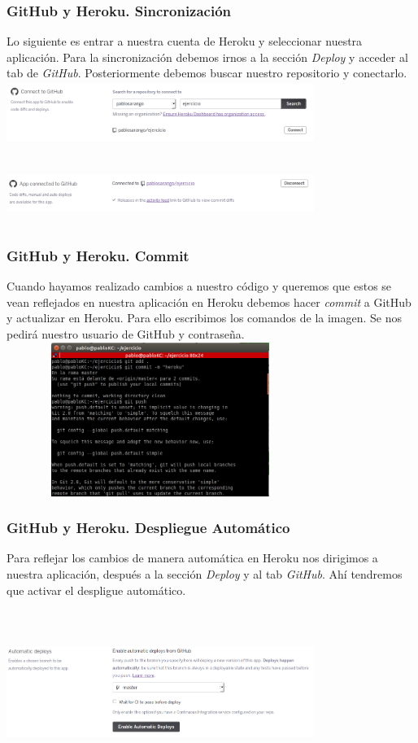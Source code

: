 \documentclass{beamer}
\begin{document}
\begin{frame}
\frametitle{GitHub y Heroku. Sincronización}
Lo siguiente es entrar a nuestra cuenta de Heroku y seleccionar nuestra aplicación. Para la sincronización debemos irnos a la sección \textit{Deploy} y acceder al tab de \textit{GitHub}. Posteriormente debemos buscar nuestro repositorio y conectarlo.\\
\centering
\includegraphics[width=10cm, height=2cm]{githubHeroku/15.png}
\\ \ \\
\includegraphics[width=10cm, height=2cm]{githubHeroku/16.png}
\end{frame}

\begin{frame}
\frametitle{GitHub y Heroku. Commit}
Cuando hayamos realizado cambios a nuestro código y queremos que estos se vean reflejados en nuestra aplicación en Heroku debemos hacer \textit{commit} a GitHub y actualizar en Heroku. Para ello escribimos los comandos de la imagen. Se nos pedirá nuestro usuario de GitHub y contraseña.\\
\centering
\includegraphics[width=10cm, height=5cm]{githubHeroku/28.png}
\end{frame}

\begin{frame}
\frametitle{GitHub y Heroku. Despliegue Automático}
Para reflejar los cambios de manera automática en Heroku nos dirigimos a nuestra aplicación, después a la sección \textit{Deploy} y al tab \textit{GitHub}. Ahí tendremos que activar el despligue automático.\\ \ \\
\includegraphics[width=10cm, height=5cm]{githubHeroku/33.png}
\end{frame}
\end{document}
